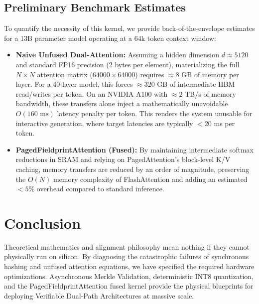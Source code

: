 \documentclass{article}
\begin{document}
\subsection{Preliminary Benchmark Estimates}
To quantify the necessity of this kernel, we provide back-of-the-envelope estimates for a 13B parameter model operating at a 64k token context window:
\begin{itemize}
    \item \textbf{Naive Unfused Dual-Attention:} Assuming a hidden dimension $d \approx 5120$ and standard FP16 precision (2 bytes per element), materializing the full $N \times N$ attention matrix ($64000 \times 64000$) requires $\approx 8$ GB of memory per layer. For a 40-layer model, this forces $\approx 320$ GB of intermediate HBM read/writes per token. On an NVIDIA A100 with $\approx 2$ TB/s of memory bandwidth, these transfers alone inject a mathematically unavoidable $O(\text{160 ms})$ latency penalty per token. This renders the system unusable for interactive generation, where target latencies are typically $<20$ ms per token.
    \item \textbf{PagedFieldprintAttention (Fused):} By maintaining intermediate softmax reductions in SRAM and relying on PagedAttention's block-level K/V caching, memory transfers are reduced by an order of magnitude, preserving the $O(N)$ memory complexity of FlashAttention and adding an estimated $<5\%$ overhead compared to standard inference.
\end{itemize}

\section{Conclusion}
Theoretical mathematics and alignment philosophy mean nothing if they cannot physically run on silicon. By diagnosing the catastrophic failures of synchronous hashing and unfused attention equations, we have specified the required hardware optimizations. Asynchronous Merkle Validation, deterministic INT8 quantization, and the PagedFieldprintAttention fused kernel provide the physical blueprints for deploying Verifiable Dual-Path Architectures at massive scale.
\end{document}
